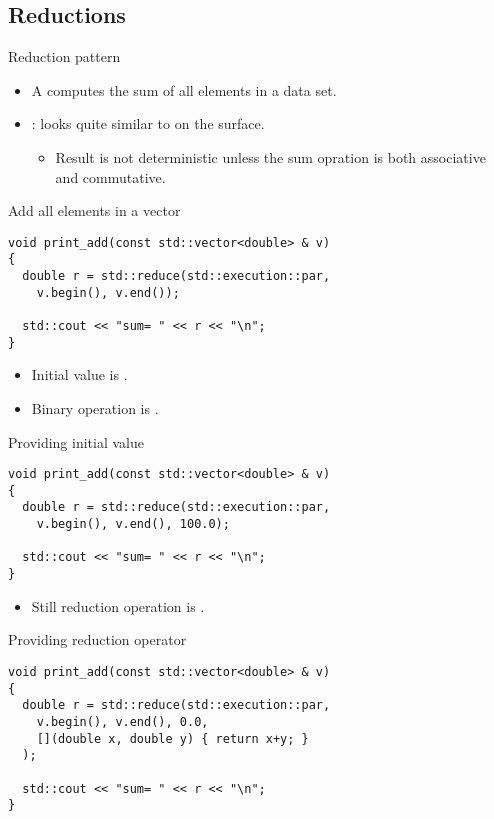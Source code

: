 \subsection{Reductions}

\begin{frame}[t]{Reduction pattern}
\begin{itemize}
  \item A  computes the sum of all elements
        in a data set.

  \vspace{1em}\pause
  \item {}:  looks quite similar
        to  on the surface.
    \begin{itemize}
      \item Result is not deterministic unless the sum opration
            is both associative and commutative.
    \end{itemize}
\end{itemize}
\end{frame}

\begin{frame}[t,fragile]{Add all elements in a vector}
\begin{lstlisting}
void print_add(const std::vector<double> & v)
{
  double r = std::reduce(std::execution::par,
    v.begin(), v.end());

  std::cout << "sum= " << r << "\n";
}
\end{lstlisting}
\vfill
\begin{itemize}
  \item Initial value is .
  \item Binary operation is .
\end{itemize}
\end{frame}

\begin{frame}[t,fragile]{Providing initial value}
\begin{lstlisting}
void print_add(const std::vector<double> & v)
{
  double r = std::reduce(std::execution::par,
    v.begin(), v.end(), 100.0);

  std::cout << "sum= " << r << "\n";
}
\end{lstlisting}
\begin{itemize}
  \item Still reduction operation is .
\end{itemize}
\end{frame}

\begin{frame}[t,fragile]{Providing reduction operator}
\begin{lstlisting}
void print_add(const std::vector<double> & v)
{
  double r = std::reduce(std::execution::par,
    v.begin(), v.end(), 0.0,
    [](double x, double y) { return x+y; }
  );

  std::cout << "sum= " << r << "\n";
}
\end{lstlisting}
\end{frame}

